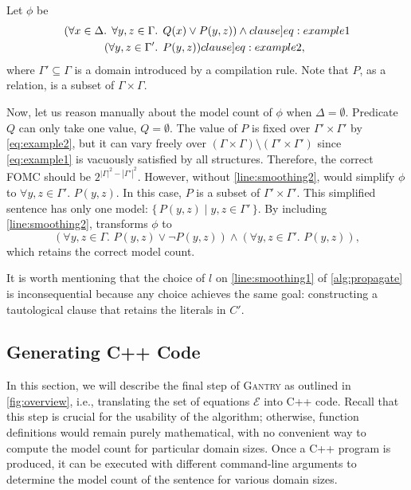 \documentclass[a4paper,UKenglish,cleveref,autoref,thm-restate]{lipics-v2021}
\newcommand{\Cranetwo}{\textsc{Gantry}}
\begin{document}
\begin{example}\label{example:basecasesmoothing}
  Let $\phi$ be
  \begin{align}
    (\forall x \in \Delta\text{. }\forall y, z \in \Gamma&\text{. }Q(x) \lor P(y, z))\land{}\label[clause]{eq:example1}\\
    (\forall y, z \in \Gamma'&\text{. }P(y, z))\label[clause]{eq:example2},
  \end{align}
  where $\Gamma' \subseteq \Gamma$ is a domain introduced by a compilation rule.
  Note that $P$, as a relation, is a subset of $\Gamma \times \Gamma$.

  Now, let us reason manually about the model count of $\phi$ when
  $\Delta = \emptyset$. Predicate $Q$ can only take one value, $Q = \emptyset$.
  The value of $P$ is fixed over $\Gamma' \times \Gamma'$ by \cref{eq:example2},
  but it can vary freely over
  $(\Gamma \times \Gamma) \setminus (\Gamma' \times \Gamma')$ since
  \cref{eq:example1} is vacuously satisfied by all structures. Therefore, the
  correct FOMC should be $2^{|\Gamma|^2 - |\Gamma'|^2}$. However, without
  \autoref{line:smoothing2}, \Propagate would simplify $\phi$ to
  $\forall y, z \in \Gamma'\text{. }P(y, z)$. In this case, $P$ is a subset of
  $\Gamma' \times \Gamma'$. This simplified sentence has only one model:
  $\{\, P(y, z) \mid y, z \in \Gamma' \,\}$. By including
  \autoref{line:smoothing2}, \Propagate transforms $\phi$ to
  \[
    (\forall y, z \in \Gamma\text{. }P(y, z) \lor \neg P(y, z)) \land (\forall y, z \in \Gamma'\text{. }P(y, z)),
  \]
  which retains the correct model count.
\end{example}

It is worth mentioning that the choice of $l$ on \autoref{line:smoothing1} of
\cref{alg:propagate} is inconsequential because any choice achieves the same
goal: constructing a tautological clause that retains the literals in $C'$.

\subsection{Generating C++ Code}\label{sec:cpp}

In this section, we will describe the final step of \Cranetwo{} as outlined in
\cref{fig:overview}, i.e., translating the set of equations $\mathcal{E}$ into
C++ code. Recall that this step is crucial for the usability of the algorithm;
otherwise, function definitions would remain purely mathematical, with no
convenient way to compute the model count for particular domain sizes. Once a
C++ program is produced, it can be executed with different command-line
arguments to determine the model count of the sentence for various domain sizes.
\end{document}

